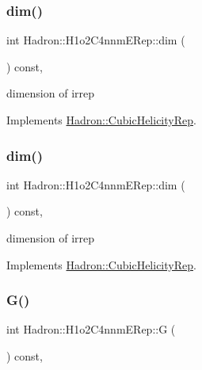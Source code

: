 \subsubsection{\texorpdfstring{dim()}{dim()}\hspace{0.1cm}{\footnotesize\ttfamily [1/2]}}
{\footnotesize\ttfamily int Hadron\+::\+H1o2\+C4nnm\+E\+Rep\+::dim (\begin{DoxyParamCaption}{ }\end{DoxyParamCaption}) const\hspace{0.3cm}{\ttfamily [inline]}, {\ttfamily [virtual]}}

dimension of irrep 

Implements \mbox{\hyperlink{structHadron_1_1CubicHelicityRep_a95d229a05580e65f8bdde74a1e316855}{Hadron\+::\+Cubic\+Helicity\+Rep}}.

\mbox{\label{structHadron_1_1H1o2C4nnmERep_a5143b2b23d7dcc59df93fe4f3bb0222c}} 
\subsubsection{\texorpdfstring{dim()}{dim()}\hspace{0.1cm}{\footnotesize\ttfamily [2/2]}}
{\footnotesize\ttfamily int Hadron\+::\+H1o2\+C4nnm\+E\+Rep\+::dim (\begin{DoxyParamCaption}{ }\end{DoxyParamCaption}) const\hspace{0.3cm}{\ttfamily [inline]}, {\ttfamily [virtual]}}

dimension of irrep 

Implements \mbox{\hyperlink{structHadron_1_1CubicHelicityRep_a95d229a05580e65f8bdde74a1e316855}{Hadron\+::\+Cubic\+Helicity\+Rep}}.

\mbox{\label{structHadron_1_1H1o2C4nnmERep_a5ff5cb2d786f5befca7638a9dcaf3f14}} 
\subsubsection{\texorpdfstring{G()}{G()}\hspace{0.1cm}{\footnotesize\ttfamily [1/2]}}
{\footnotesize\ttfamily int Hadron\+::\+H1o2\+C4nnm\+E\+Rep\+::G (\begin{DoxyParamCaption}{ }\end{DoxyParamCaption}) const\hspace{0.3cm}{\ttfamily [inline]}, {\ttfamily [virtual]}}

